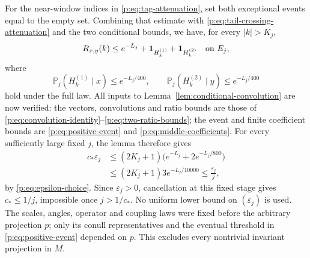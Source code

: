 For the near-window indices in \eqref{p:eq:tag-attenuation}, set both
exceptional events equal to the empty set. Combining that estimate with
\eqref{p:eq:tail-crossing-attenuation} and the two conditional bounds, we
have, for every $|k|>K_j$,
\[
 R_{x,y}(k)\le e^{-L_j}
       +\mathbf 1_{H_k^{(1)}}+\mathbf 1_{H_k^{(2)}}\quad\text{on }E_j,
\]
where
\[
 \mathbb P_j(H_k^{(1)}\mid x)\le e^{-L_j/400},\qquad
 \mathbb P_j(H_k^{(2)}\mid y)\le e^{-L_j/400}
\]
hold under the full law. All inputs to
Lemma~\ref{lem:conditional-convolution} are now verified: the vectors,
convolutions and ratio bounds are those of
\eqref{p:eq:convolution-identity}--\eqref{p:eq:two-ratio-bounds}; the event
and finite coefficient bounds are \eqref{p:eq:positive-event} and
\eqref{p:eq:middle-coefficients}. For every sufficiently large fixed $j$,
the lemma therefore gives
\begin{equation}\label{p:eq:final-contradiction}
 \begin{split}
 c_*\varepsilon_j
 &\le (2K_j+1)\bigl(e^{-L_j}+2e^{-L_j/800}\bigr)\\
 &\le (2K_j+1)3e^{-L_j/10000}
 \le \frac{\varepsilon_j}{j},
 \end{split}
\end{equation}
by \eqref{p:eq:epsilon-choice}. Since $\varepsilon_j>0$, cancellation at
this fixed stage gives $c_*\le1/j$, impossible once $j>1/c_*$.
No uniform lower bound on $(\varepsilon_j)$ is used. The scales, angles,
operator and coupling laws were fixed before the arbitrary projection
$p$; only its conull representatives and the eventual threshold in
\eqref{p:eq:positive-event} depended on $p$. This excludes every
nontrivial invariant projection in $M$.
